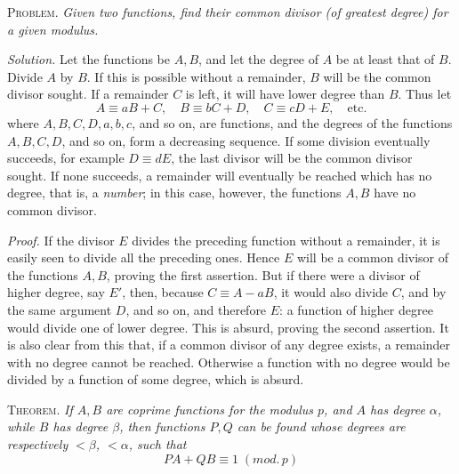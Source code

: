 \textsc{Problem.} \emph{Given two functions, find their common divisor (of greatest degree) for a given modulus.}

\emph{Solution.} Let the functions be $A,B$, and let the degree of $A$ be at least that of $B$. Divide $A$ by $B$. If this is possible without a remainder, $B$ will be the common divisor sought. If a remainder $C$ is left, it will have lower degree than $B$. Thus let
\[
A\equiv aB+C,\quad B\equiv bC+D,\quad C\equiv cD+E,\quad\text{etc.}
\]
where $A,B,C,D,a,b,c$, and so on, are functions, and the degrees of the functions $A,B,C,D$, and so on, form a decreasing sequence. If some division eventually succeeds, for example $D\equiv dE$, the last divisor will be the common divisor sought. If none succeeds, a remainder will eventually be reached which has no degree,
that is, a \emph{number}; in this case, however, the functions $A,B$ have no common divisor.

\emph{Proof.} If the divisor $E$ divides the preceding function without a remainder, it is easily seen to divide all the preceding ones. Hence $E$ will be a common divisor of the functions $A,B$, proving the first assertion. But if there were a divisor of higher degree, say $E'$, then, because $C\equiv A-aB$, it would also divide $C$, and by the same argument $D$, and so on, and therefore $E$: a function of higher degree would divide one of lower degree. This is absurd, proving the second assertion. It is also clear from this that, if a common divisor of any degree exists, a remainder with no degree cannot be reached. Otherwise a function with no degree would be divided by a function of some degree, which is absurd.

\textsc{Theorem.} \emph{If $A,B$ are coprime functions for the modulus $p$, and $A$ has degree $\alpha$, while $B$ has degree $\beta$, then functions $P,Q$ can be found whose degrees are respectively $<\beta$, $<\alpha$, such that}
\[
PA+QB\equiv1\;(\mathit{mod.}\,p)
\]

